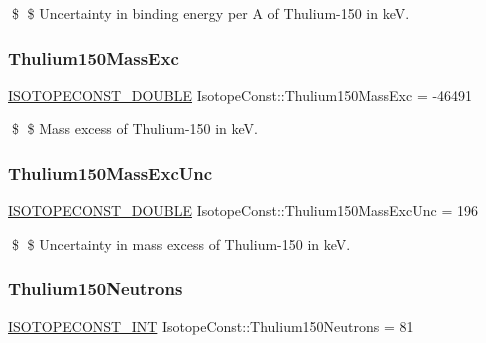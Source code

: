 \$ \$ Uncertainty in binding energy per A of Thulium-\/150 in keV. \mbox{\label{group___isotope_const-_thulium-_tm150_ga2db62b7aa86a179564244fd0c794fa7e}} 
\subsubsection{\texorpdfstring{Thulium150\+Mass\+Exc}{Thulium150MassExc}}
{\footnotesize\ttfamily \mbox{\hyperlink{group___isotope_const-_macros_ga8f45a7272ce02c0b4c65c44636ed719a}{I\+S\+O\+T\+O\+P\+E\+C\+O\+N\+S\+T\+\_\+\+D\+O\+U\+B\+LE}} Isotope\+Const\+::\+Thulium150\+Mass\+Exc = -\/46491}

\$ \$ Mass excess of Thulium-\/150 in keV. \mbox{\label{group___isotope_const-_thulium-_tm150_ga2979f6a14fbc955eb90e3735deb75d3a}} 
\subsubsection{\texorpdfstring{Thulium150\+Mass\+Exc\+Unc}{Thulium150MassExcUnc}}
{\footnotesize\ttfamily \mbox{\hyperlink{group___isotope_const-_macros_ga8f45a7272ce02c0b4c65c44636ed719a}{I\+S\+O\+T\+O\+P\+E\+C\+O\+N\+S\+T\+\_\+\+D\+O\+U\+B\+LE}} Isotope\+Const\+::\+Thulium150\+Mass\+Exc\+Unc = 196}

\$ \$ Uncertainty in mass excess of Thulium-\/150 in keV. \mbox{\label{group___isotope_const-_thulium-_tm150_ga7c480c8259281894e86acca334bd208d}} 
\subsubsection{\texorpdfstring{Thulium150\+Neutrons}{Thulium150Neutrons}}
{\footnotesize\ttfamily \mbox{\hyperlink{group___isotope_const-_macros_ga5f18360b3e99483a35c32d789e62621c}{I\+S\+O\+T\+O\+P\+E\+C\+O\+N\+S\+T\+\_\+\+I\+NT}} Isotope\+Const\+::\+Thulium150\+Neutrons = 81}

